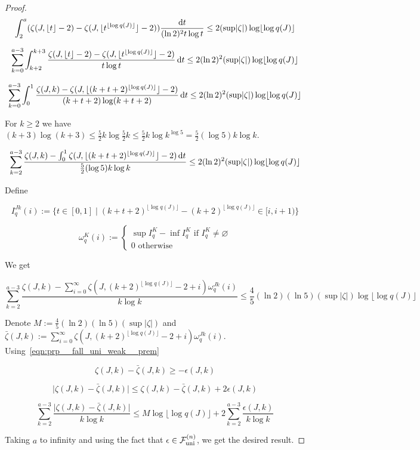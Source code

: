 \documentclass[11pt]{article}
\numberwithin{equation}{section}
\theoremstyle{definition}
\theoremstyle{plain}
\newcommand{\Abs}[1]{\lvert #1 \rvert}
\newcommand{\Floor}[1]{\lfloor #1 \rfloor}
\newcommand{\Fall}{\mathcal{F}}
\newcommand{\FallU}{{\Fall_{\textnormal{uni}}^{(n)}}}
\begin{document}
\begin{proof}


\[\int_2^a (\zeta(J,\Floor{t}-2) - \zeta(J,\Floor{t^{\Floor{\log q(J)}}}-2)) \frac{\dif t}{(\ln 2)^2 t \log t} \leq 2(\sup \Abs{\zeta}) \log \Floor{\log q(J)}\]

\[\sum_{k=0}^{a-3} \int_{k+2}^{k+3} \frac{\zeta(J,\Floor{t}-2) - \zeta(J,\Floor{t^{\Floor{\log q(J)}}}-2)}{t \log t} \dif t \leq 2(\ln 2)^2(\sup \Abs{\zeta}) \log \Floor{\log q(J)}\]

\[\sum_{k=0}^{a-3} \int_0^1 \frac{\zeta(J,k) - \zeta(J,\Floor{(k+t+2)^{\Floor{\log q(J)}}}-2)}{(k+t+2) \log (k+t+2)}\dif t \leq 2(\ln 2)^2(\sup \Abs{\zeta}) \log \Floor{\log q(J)}\]

For ${k \geq 2}$ we have ${(k + 3) \log (k + 3) \leq \frac{5}{2}k \log \frac{5}{2}k \leq \frac{5}{2}k \log k^{\log 5} = \frac{5}{2} (\log 5) k \log k}$.

\[\sum_{k=2}^{a-3} \frac{\zeta(J,k) - \int_0^1 \zeta(J,\Floor{(k+t+2)^{\Floor{\log q(J)}}}-2)\dif t}{\frac{5}{2} (\log 5) k \log k} \leq 2(\ln 2)^2(\sup \Abs{\zeta}) \log \Floor{\log q(J)}\]

Define

\[I_q^{Jk}(i):=\{t \in [0,1] \mid (k+t+2)^{\Floor{\log q(J)}} - (k+2)^{\Floor{\log q(J)}} \in [i,i+1)\}\]

\[\omega_q^K(i):=\begin{cases}\sup I_q^K-\inf I_q^K \text{ if } I_q^K \ne \varnothing\\0 \text{ otherwise}\end{cases}\]

We get

\[\sum_{k=2}^{a-3} \frac{\zeta(J,k) - \sum_{i=0}^\infty \zeta(J,(k+2)^{\Floor{\log q(J)}}-2+i)\omega_q^{Jk}(i) }{k \log k}  \leq \frac{4}{5}(\ln 2)(\ln 5)(\sup \Abs{\zeta}) \log \Floor{\log q(J)}\]

Denote $M:=\frac{4}{5}(\ln 2)(\ln 5)(\sup \Abs{\zeta})$ and $\bar{\zeta}(J,k):=\sum_{i=0}^\infty \zeta(J,(k+2)^{\Floor{\log q(J)}}-2+i)\omega_q^{Jk}(i)$. Using~\ref{eqn:prp__fall_uni_weak__prem}

\[\zeta(J,k) - \bar{\zeta}(J,k) \geq -\epsilon(J,k)\]

\[\Abs{\zeta(J,k) - \bar{\zeta}(J,k)} \leq \zeta(J,k) - \bar{\zeta}(J,k) + 2\epsilon(J,k)\]

\[\sum_{k=2}^{a-3} \frac{\Abs{\zeta(J,k) - \bar{\zeta}(J,k)}}{k \log k}  \leq M \log \Floor{\log q(J)}+2\sum_{k=2}^{a-3}\frac{\epsilon(J,k)}{k\log{k}} \]

Taking $a$ to infinity and using the fact that $\epsilon\in\FallU$, we get the desired result.
%
\end{proof}
\end{document}
